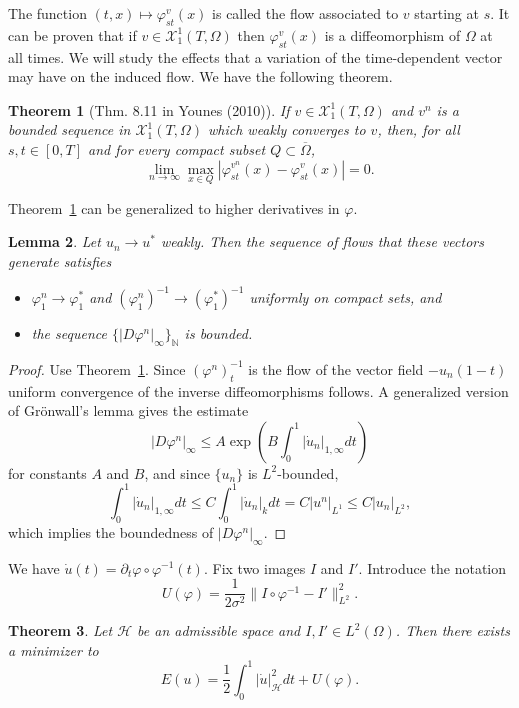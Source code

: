 \documentclass{article}
\theoremstyle{plain}
\newtheorem{teo}{Theorem}[section]
\newtheorem{lem}[teo]{Lemma}
\theoremstyle{definition}
\newcommand{\N}{\ensuremath{\mathbb{N}}}
\begin{document}
The function $(t,x)\mapsto \varphi^v_{st}(x)$ is called the flow associated to $v$ starting at $s$. It can be proven that if $v\in\mathcal{X}_1^1(T,\Omega)$ then $\varphi^v_{st}(x)$ is a diffeomorphism of $\Omega$ at all times. We will study the effects that a variation of the time-dependent vector may have on the induced flow. We have the following theorem.

\begin{teo}[Thm. 8.11 in Younes (2010)]
\label{teo:811}
If $v\in\mathcal{X}_1^1(T,\Omega)$ and $v^n$ is a bounded sequence in $\mathcal{X}_1^1(T,\Omega)$ which weakly converges to $v$, then, for all $s,t\in[0,T]$ and for every compact subset $Q\subset \overline{\Omega}$,
\[
\lim_{n\to\infty} \max_{x\in Q} |\varphi_{st}^{v^n}(x)-\varphi_{st}^{v}(x)|=0.
\]
\end{teo}

Theorem~\ref{teo:811} can be generalized to higher derivatives in $\varphi$.

\begin{lem}
\label{lem:weak}
Let $u_n\to u^*$ weakly. Then the sequence of flows that these vectors generate satisfies 
\begin{itemize}
	\item $\varphi_1^n\to \varphi_1^*$ and $(\varphi_1^n)^{-1}\to (\varphi_1^*)^{-1}$ uniformly on compact sets, and
	\item the sequence $\{|D\varphi^n|_\infty\}_\N$ is bounded.
\end{itemize}
\end{lem}
\begin{proof}
Use Theorem~\ref{teo:811}. Since $(\varphi^n)_t^{-1}$ is the flow of the vector field $-u_n(1-t)$ uniform convergence of the inverse diffeomorphisms follows. A  generalized  version  of Grönwall's lemma gives the estimate
\[
|D\varphi^n|_\infty\leq A \exp\left(B\int_0^1 |\dot{u}_n|_{1,\infty}dt\right)
\]
for constants $A$ and $B$, and since $\{u_n\}$ is $L^2$-bounded,
\[
\int_0^1|\dot{u}_n|_{1,\infty}dt\leq C\int_0^1 |\dot{u}_n|_k dt =C|u^n|_{L^1}\leq C|u_n|_{L^2}, 
\]
which implies the boundedness of $|D\varphi^n|_\infty$.
\end{proof}

We have $\dot{u}(t)=\partial_t\varphi \circ \varphi^{-1}(t)$. Fix two images $I$ and $I'$. Introduce the notation
\[
U(\varphi)= \frac{1}{2\sigma^2}\|I\circ \varphi^{-1}-I'\|^2_{L^2}.
\]

\begin{teo}
Let $\mathcal H$ be an admissible space  and $I,I'\in L^2(\Omega)$. Then there exists a minimizer to
\[
E(u)=\frac{1}{2}\int_0^1 |\dot{u}|_{\mathcal H}^2 dt + U(\varphi).
\]
\end{teo}
\end{document}
